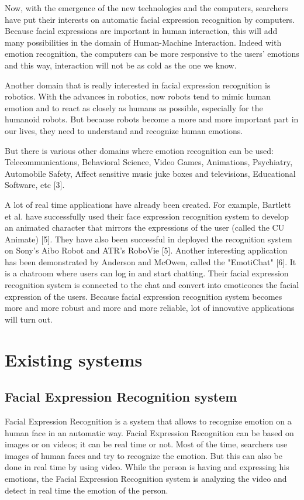 Now, with the emergence of the new technologies and the computers, searchers have put their interests on automatic facial expression recognition by computers. Because facial expressions are important in human interaction, this will add many possibilities in the domain of Human-Machine Interaction. Indeed with emotion recognition, the computers can be more responsive to the users' emotions and this way, interaction will not be as cold as the one we know. 

Another domain that is really interested in facial expression recognition is robotics. With the advances in robotics, now robots tend to mimic human emotion and to react as closely as humans as possible, especially for the humanoid robots. But because robots become a more and more important part in our lives, they need to understand and recognize human emotions.

But there is various other domains where emotion recognition can be used: Telecommunications, Behavioral Science, Video Games, Animations, Psychiatry, Automobile Safety, Affect sensitive music juke boxes and televisions, Educational Software, etc [3].

A lot of real time applications have already been created. For example, Bartlett et al. have successfully used their face expression recognition system to develop an animated character that mirrors the expressions of the user (called the CU Animate) [5]. They have also been successful in deployed the recognition system on Sony's Aibo Robot and ATR's RoboVie [5]. Another interesting application has been demonstrated by Anderson and McOwen, called the "EmotiChat" [6]. It is a chatroom where users can log in and start chatting. Their facial expression recognition system is connected to the chat and convert into emoticones the facial expression of the users. Because facial expression recognition system becomes more and more robust and more and more reliable, lot of innovative applications will turn out.

\chapter{Existing systems}

\section{Facial Expression Recognition system}

Facial Expression Recognition is a system that allows to recognize emotion on a human face in an automatic way. Facial Expression Recognition can be based on images or on videos; it can be real time or not. Most of the time, searchers use images of human faces and try to recognize the emotion. But this can also be done in real time by using video. While the person is having and expressing his emotions, the Facial Expression Recognition system is analyzing the video and detect in real time the emotion of the person.

